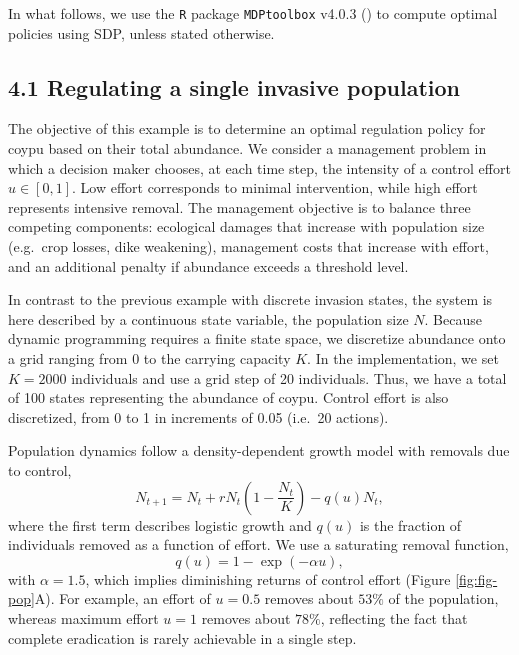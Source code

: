 \documentclass[
  11pt,
  a4paper,
]{article}
\begin{document}
In what follows, we use the \texttt{R} package \texttt{MDPtoolbox} v4.0.3 () to compute optimal policies using SDP, unless stated otherwise.

\subsection{4.1 Regulating a single invasive population}\label{regulating-a-single-invasive-population}

The objective of this example is to determine an optimal regulation policy for coypu based on their total abundance. We consider a management problem in which a decision maker chooses, at each time step, the intensity of a control effort \(u \in [0,1]\). Low effort corresponds to minimal intervention, while high effort represents intensive removal. The management objective is to balance three competing components: ecological damages that increase with population size (e.g.~crop losses, dike weakening), management costs that increase with effort, and an additional penalty if abundance exceeds a threshold level.

In contrast to the previous example with discrete invasion states, the system is here described by a continuous state variable, the population size \(N\). Because dynamic programming requires a finite state space, we discretize abundance onto a grid ranging from 0 to the carrying capacity \(K\). In the implementation, we set \(K=2000\) individuals and use a grid step of 20 individuals. Thus, we have a total of 100 states representing the abundance of coypu. Control effort is also discretized, from 0 to 1 in increments of 0.05 (i.e.~20 actions).

Population dynamics follow a density-dependent growth model with removals due to control,
\[
N_{t+1} = N_t + rN_t\left(1-\frac{N_t}{K}\right) - q(u)N_t ,
\]
where the first term describes logistic growth and \(q(u)\) is the fraction of individuals removed as a function of effort. We use a saturating removal function,
\[
q(u)=1-\exp(-\alpha u),
\]
with \(\alpha=1.5\), which implies diminishing returns of control effort (Figure \ref{fig:fig-pop}A). For example, an effort of \(u=0.5\) removes about \(53\%\) of the population, whereas maximum effort \(u=1\) removes about \(78\%\), reflecting the fact that complete eradication is rarely achievable in a single step.
\end{document}
